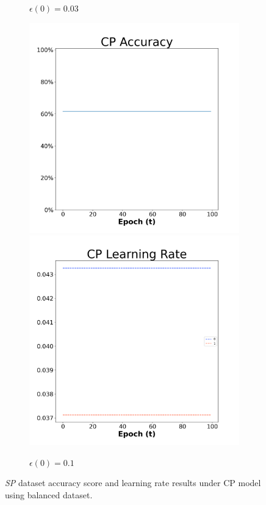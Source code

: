 \begin{figure}[H]
\begin{subfigure}{0.3\textwidth}
\caption{$\epsilon(0)=0.03$}
\end{subfigure}\hfil %
\begin{subfigure}{0.3\textwidth}
\includegraphics[width=\linewidth]{images/exper1/SP/CP_0.1_acc.png}
\includegraphics[width=\linewidth]{images/exper1/SP/CP_0.1_lr.png}
\caption{$\epsilon(0)=0.1$}
\end{subfigure}

\caption{\textit{SP} dataset accuracy score and learning rate results under CP model using balanced dataset.}
\end{figure}

